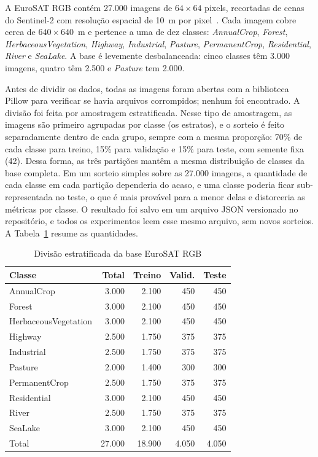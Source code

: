 \documentclass[conference,a4paper]{IEEEtran}
\begin{document}
A EuroSAT RGB contém 27.000 imagens de $64\times64$ pixels, recortadas de cenas do Sentinel-2 com resolução espacial de 10~m por pixel~\cite{helber2019eurosat}. Cada imagem cobre cerca de $640\times640$~m e pertence a uma de dez classes: \textit{AnnualCrop}, \textit{Forest}, \textit{HerbaceousVegetation}, \textit{Highway}, \textit{Industrial}, \textit{Pasture}, \textit{PermanentCrop}, \textit{Residential}, \textit{River} e \textit{SeaLake}. A base é levemente desbalanceada: cinco classes têm 3.000 imagens, quatro têm 2.500 e \textit{Pasture} tem 2.000.

Antes de dividir os dados, todas as imagens foram abertas com a biblioteca Pillow para verificar se havia arquivos corrompidos; nenhum foi encontrado. A divisão foi feita por amostragem estratificada. Nesse tipo de amostragem, as imagens são primeiro agrupadas por classe (os estratos), e o sorteio é feito separadamente dentro de cada grupo, sempre com a mesma proporção: 70\% de cada classe para treino, 15\% para validação e 15\% para teste, com semente fixa (42). Dessa forma, as três partições mantêm a mesma distribuição de classes da base completa. Em um sorteio simples sobre as 27.000 imagens, a quantidade de cada classe em cada partição dependeria do acaso, e uma classe poderia ficar sub-representada no teste, o que é mais provável para a menor delas e distorceria as métricas por classe. O resultado foi salvo em um arquivo JSON versionado no repositório, e todos os experimentos leem esse mesmo arquivo, sem novos sorteios. A Tabela~\ref{tab:divisao} resume as quantidades.

\begin{table}[H]
\centering
\caption{Divisão estratificada da base EuroSAT RGB}
\label{tab:divisao}
\begin{tabular}{lrrrr}
\toprule
Classe & Total & Treino & Valid. & Teste \\
\midrule
AnnualCrop           & 3.000 & 2.100 & 450 & 450 \\
Forest               & 3.000 & 2.100 & 450 & 450 \\
HerbaceousVegetation & 3.000 & 2.100 & 450 & 450 \\
Highway              & 2.500 & 1.750 & 375 & 375 \\
Industrial           & 2.500 & 1.750 & 375 & 375 \\
Pasture              & 2.000 & 1.400 & 300 & 300 \\
PermanentCrop        & 2.500 & 1.750 & 375 & 375 \\
Residential          & 3.000 & 2.100 & 450 & 450 \\
River                & 2.500 & 1.750 & 375 & 375 \\
SeaLake              & 3.000 & 2.100 & 450 & 450 \\
\midrule
Total                & 27.000 & 18.900 & 4.050 & 4.050 \\
\bottomrule
\end{tabular}
\end{table}
\end{document}
